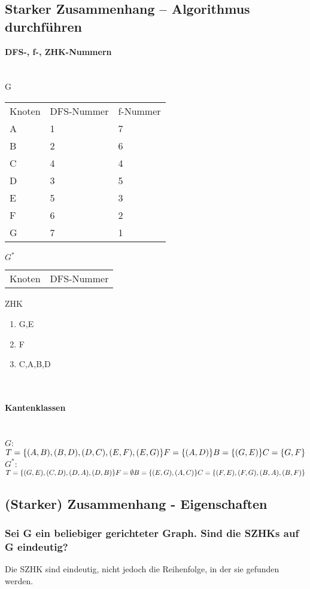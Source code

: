 \documentclass{article}
\newcommand{\gap}{\null\ \\ \ \\}
\newcommand{\task}[1]{\textbf{#1} \\ \gap}
\begin{document}
\subsection{Starker Zusammenhang – Algorithmus durchführen}
\task{DFS-, f-, ZHK-Nummern}
G\\
\begin{tabular}{lll}
    Knoten      &DFS-Nummer     &f-Nummer\\
    A           &1              &7\\
    B           &2              &6\\
    C           &4              &4\\
    D           &3              &5\\
    E           &5              &3\\
    F           &6              &2\\
    G           &7              &1\\
\end{tabular}
$G^*$\\
\begin{tabular}{ll}
    Knoten      &DFS-Nummer
\end{tabular}
ZHK\\
\begin{enumerate}
    \item G,E
    \item F
    \item C,A,B,D
\end{enumerate}
\gap
\task{Kantenklassen}
$G$:\\$
    T = \{(A,B), (B,D), (D,C), (E,F), (E,G)\}\\
    F = \{(A,D)\}\\
    B = \{(G,E)\}\\
    C = \{G,F\}\\
    $\\
$G^*$:\\$
    T = \{(G,E), (C,D), (D,A), (D,B)\}\\
    F = \emptyset\\
    B = \{(E,G), (A,C)\}\\
    C = \{(F,E), (F,G), (B,A), (B,F)\}\\
    $\\
\subsection{(Starker) Zusammenhang - Eigenschaften}
\subsubsection{
    Sei G ein beliebiger gerichteter Graph. Sind die SZHKs auf G eindeutig?
    }
Die SZHK sind eindeutig, nicht jedoch die Reihenfolge, in der sie gefunden
    werden.\\
\end{document}
